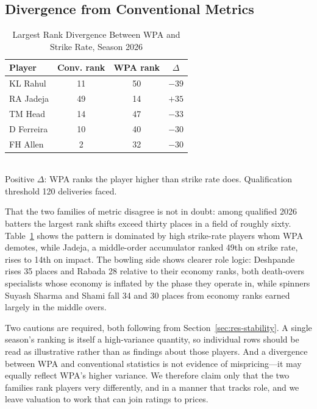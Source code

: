 \documentclass[conference]{IEEEtran}
\begin{document}
\subsection{Divergence from Conventional Metrics}

\begin{table}[htbp]
\caption{Largest Rank Divergence Between WPA and Strike Rate, Season 2026}
\label{tab:divergence}
\centering
\begin{tabular}{lccc}
\toprule
\textbf{Player} & \textbf{Conv. rank} & \textbf{WPA rank} & \textbf{$\Delta$} \\
\midrule
KL Rahul & 11 & 50 & $-39$ \\
RA Jadeja & 49 & 14 & $+35$ \\
TM Head & 14 & 47 & $-33$ \\
D Ferreira & 10 & 40 & $-30$ \\
FH Allen & 2 & 32 & $-30$ \\
\bottomrule
\end{tabular}
\\[2pt]\footnotesize Positive $\Delta$: WPA ranks the player higher than
strike rate does. Qualification threshold 120 deliveries faced.
\end{table}

That the two families of metric disagree is not in doubt: among
qualified 2026 batters the largest rank shifts exceed thirty places in a
field of roughly sixty. Table~\ref{tab:divergence} shows the pattern is
dominated by high strike-rate players whom WPA demotes, while Jadeja, a
middle-order accumulator ranked 49th on strike rate, rises to 14th on
impact. The bowling side shows clearer role logic: Deshpande rises 35
places and Rabada 28 relative to their economy ranks, both death-overs
specialists whose economy is inflated by the phase they operate in,
while spinners Suyash Sharma and Shami fall 34 and 30 places from
economy ranks earned largely in the middle overs.

Two cautions are required, both following from
Section~\ref{sec:res-stability}. A single season's ranking is itself a
high-variance quantity, so individual rows should be read as
illustrative rather than as findings about those players. And a
divergence between WPA and conventional statistics is not evidence of
mispricing---it may equally reflect WPA's higher variance. We therefore
claim only that the two families rank players very differently, and in a
manner that tracks role, and we leave valuation to work that can join
ratings to prices.
\end{document}
